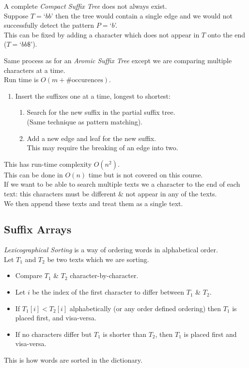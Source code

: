 \documentclass[11pt,a4paper]{article}
\begin{document}
A complete \textit{Compact Suffix Tree} does not always exist.\\
Suppose $T=$`$bb$' then the tree would contain a single edge and we would not successfully detect the pattern $P=$`$b$'.\\
This can be fixed by adding a character which does not appear in $T$ onto the end (\eg $T=$`$bb\$$').

Same process as for an \textit{Aromic Suffix Tree} except we are comparing multiple characters at a time.\\
Run time is $O(m+\#\text{occurences})$.\\

\begin{enumerate}
	\item Insert the suffixes one at a time, longest to shortest:
	\begin{enumerate}
		\item Search for the new suffix in the partial suffix tree.\\
		(Same technique as pattern matching).
		\item Add a new edge and leaf for the new suffix.\\
		This may require the breaking of an edge into two.
	\end{enumerate}
\end{enumerate}
This has run-time complexity $O(n^2)$.\\
\nb This can be done in $O(n)$ time but is not covered on this course.\\

If we want to be able to search multiple texts we a character to the end of each text: this characters must be different \& not appear in any of the texts.\\
We then append these texts and treat them as a single text.

\subsection{Suffix Arrays}

\textit{Lexicographical Sorting} is a way of ordering words in alphabetical order.\\
Let $T_1$ and $T_2$ be two texts which we are sorting.
\begin{itemize}
	\item Compare $T_1$ \& $T_2$ character-by-character.
	\item Let $i$ be the index of the first character to differ between $T_1$ \& $T_2$.
	\item If $T_1[i]<T_2[i]$ alphabetically (or any order defined ordering) then $T_1$ is placed first, and visa-versa.
	\item If no characters differ but $T_1$ is shorter than $T_2$, then $T_1$ is placed first and visa-versa.
\end{itemize}
\nb This is how words are sorted in the dictionary.\\
\end{document}
